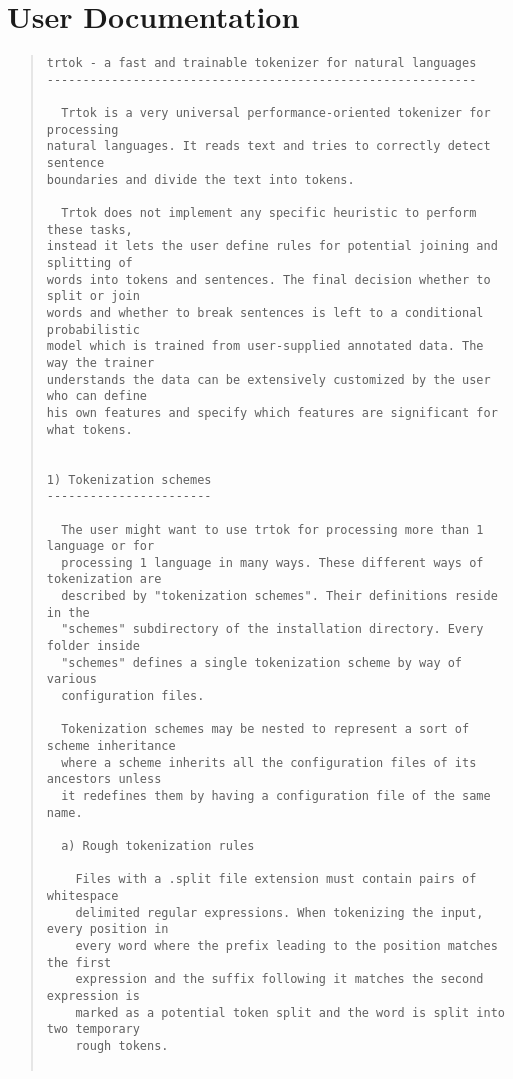 \chapter{User Documentation}

\begin{scriptsize}
\begin{quote}
\begin{verbatim}
trtok - a fast and trainable tokenizer for natural languages
------------------------------------------------------------

  Trtok is a very universal performance-oriented tokenizer for processing
natural languages. It reads text and tries to correctly detect sentence
boundaries and divide the text into tokens.

  Trtok does not implement any specific heuristic to perform these tasks,
instead it lets the user define rules for potential joining and splitting of
words into tokens and sentences. The final decision whether to split or join
words and whether to break sentences is left to a conditional probabilistic
model which is trained from user-supplied annotated data. The way the trainer
understands the data can be extensively customized by the user who can define
his own features and specify which features are significant for what tokens.


1) Tokenization schemes
-----------------------

  The user might want to use trtok for processing more than 1 language or for
  processing 1 language in many ways. These different ways of tokenization are
  described by "tokenization schemes". Their definitions reside in the
  "schemes" subdirectory of the installation directory. Every folder inside
  "schemes" defines a single tokenization scheme by way of various
  configuration files.

  Tokenization schemes may be nested to represent a sort of scheme inheritance
  where a scheme inherits all the configuration files of its ancestors unless
  it redefines them by having a configuration file of the same name.

  a) Rough tokenization rules

    Files with a .split file extension must contain pairs of whitespace
    delimited regular expressions. When tokenizing the input, every position in
    every word where the prefix leading to the position matches the first
    expression and the suffix following it matches the second expression is
    marked as a potential token split and the word is split into two temporary
    rough tokens. 


\end{verbatim}
\end{quote}
\end{scriptsize}
